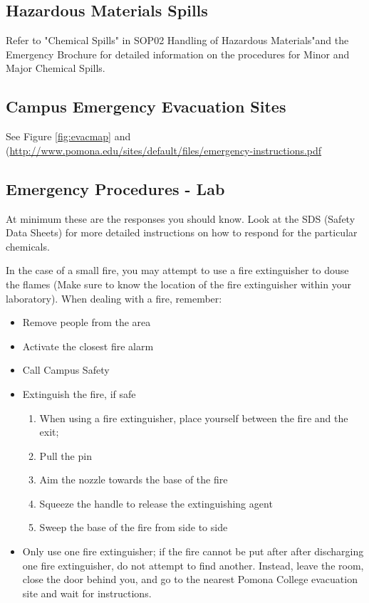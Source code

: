 \documentclass[12pt]{../SOP3_beta}
\begin{document}
\subsection{Hazardous Materials Spills}

\NP Refer to "Chemical Spills" in SOP02 Handling of Hazardous Materials"and the Emergency Brochure for detailed information on the procedures for Minor and Major Chemical Spills.

\subsection{Campus Emergency Evacuation Sites}

See Figure \ref{fig:evacmap} and (\href{Pomona College Emergiency Instruction}{http://www.pomona.edu/sites/default/files/emergency-instructions.pdf}

\subsection*{Emergency Procedures - Lab}

\NP At minimum these are the responses you should know. Look at the SDS (Safety Data Sheets) for more detailed instructions on how to respond for the particular chemicals.  

\NP In the case of a small fire, you may attempt to use a fire extinguisher to douse the flames (Make sure to know the location of the fire extinguisher within your laboratory). 
When dealing with a fire, remember:

\begin{itemize}
  \item Remove people from the area
  \item Activate the closest fire alarm
  \item Call Campus Safety
  \item Extinguish the fire, if safe
    \begin{enumerate}
      \item When using a fire extinguisher, place yourself between the fire and the exit; 
	    \item Pull the pin
	    \item Aim the nozzle towards the base of the fire
	    \item Squeeze the handle to release the extinguishing agent
	    \item Sweep the base of the fire from side to side
    \end{enumerate}

  \item Only use one fire extinguisher; if the fire cannot be put after after discharging one fire extinguisher, do not attempt to find another. Instead, leave the room, close the door behind you, and go to the nearest Pomona College evacuation site and wait for instructions.
  
\end{itemize}
\end{document}
